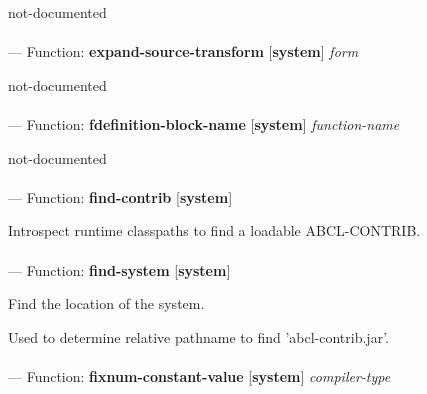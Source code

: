 \begin{adjustwidth}{5em}{5em}
not-documented
\end{adjustwidth}

\paragraph{}
\label{SYSTEM:EXPAND-SOURCE-TRANSFORM}
--- Function: \textbf{expand-source-transform} [\textbf{system}] \textit{form}

\begin{adjustwidth}{5em}{5em}
not-documented
\end{adjustwidth}

\paragraph{}
\label{SYSTEM:FDEFINITION-BLOCK-NAME}
--- Function: \textbf{fdefinition-block-name} [\textbf{system}] \textit{function-name}

\begin{adjustwidth}{5em}{5em}
not-documented
\end{adjustwidth}

\paragraph{}
\label{SYSTEM:FIND-CONTRIB}
--- Function: \textbf{find-contrib} [\textbf{system}] \textit{}

\begin{adjustwidth}{5em}{5em}
Introspect runtime classpaths to find a loadable ABCL-CONTRIB.
\end{adjustwidth}

\paragraph{}
\label{SYSTEM:FIND-SYSTEM}
--- Function: \textbf{find-system} [\textbf{system}] \textit{}

\begin{adjustwidth}{5em}{5em}
Find the location of the system.

Used to determine relative pathname to find 'abcl-contrib.jar'.
\end{adjustwidth}

\paragraph{}
\label{SYSTEM:FIXNUM-CONSTANT-VALUE}
--- Function: \textbf{fixnum-constant-value} [\textbf{system}] \textit{compiler-type}

